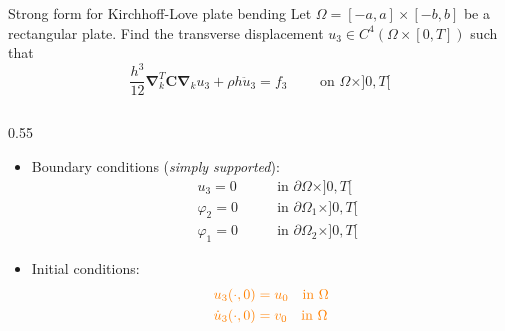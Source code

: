 \documentclass[aspectratio=169]{beamer}
\begin{document}
{  \begin{frame}{Strong form for Kirchhoff-Love plate bending}
    Let $\Omega=[-a,a]\times[-b,b]$ be a rectangular plate. Find the transverse displacement $u_{3}\in C^4(\Omega\times[0,T])$ such that
    \begin{equation*}
      \frac{h^3}{12}\boldsymbol{\nabla}_k^T \boldsymbol{C}\boldsymbol{\nabla}_ku_3+\rho h \ddot{u}_3=f_3 \qquad \text{  on  }\Omega\times]0,T[
    \end{equation*}
    \vspace{-0.5cm}
    \begin{columns}
      \begin{column}{0.55\textwidth}
        \begin{itemize}
          \item Boundary conditions (\emph{simply supported}):
                \vspace{-0.2cm}
                \[
                  \begin{aligned}
                     & u_3 = 0\qquad      & \text{in }\partial\Omega\times]0,T[   \\
                     & \varphi_2 =0\qquad & \text{in }\partial\Omega_1\times]0,T[ \\
                     & \varphi_1 =0\qquad & \text{in }\partial\Omega_2\times]0,T[
                  \end{aligned}
                \]
          \item Initial conditions:
                \[
                  \begin{aligned}
                     & \color{orange}{u_3(\cdot, 0) =  u_0 \quad \text{in }\Omega}      \\
                     & \color{orange}{\dot{u}_3(\cdot, 0) = v_0 \quad \text{in }\Omega} \\
                  \end{aligned}
                \]
        \end{itemize}
      \end{column}


\end{columns}
\end{frame}}
\end{document}

